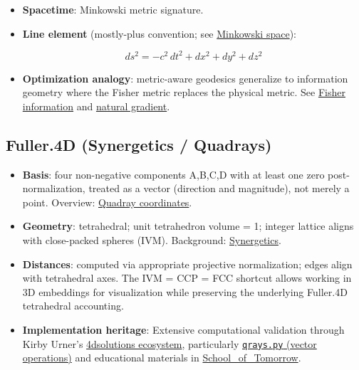 \documentclass[
  10pt,
]{article}
\providecommand{\tightlist}{%
  \setlength{\itemsep}{0pt}\setlength{\parskip}{0pt}}
\begin{document}
\begin{itemize}
\item
  \textbf{Spacetime}: Minkowski metric signature.
\item
  \textbf{Line element} (mostly-plus convention; see
  \href{https://en.wikipedia.org/wiki/Minkowski_space}{Minkowski
  space}):

  \begin{equation}\label{eq:einstein_line_element}
  ds^2 = -c^2\,dt^2 + dx^2 + dy^2 + dz^2
  \end{equation}
\item
  \textbf{Optimization analogy}: metric-aware geodesics generalize to
  information geometry where the Fisher metric replaces the physical
  metric. See
  \href{https://en.wikipedia.org/wiki/Fisher_information}{Fisher
  information} and
  \href{https://en.wikipedia.org/wiki/Natural_gradient}{natural
  gradient}.
\end{itemize}

\hypertarget{fuller.4d-synergetics-quadrays}{%
\subsection{Fuller.4D (Synergetics /
Quadrays)}\label{fuller.4d-synergetics-quadrays}}

\begin{itemize}
\tightlist
\item
  \textbf{Basis}: four non-negative components A,B,C,D with at least one
  zero post-normalization, treated as a vector (direction and
  magnitude), not merely a point. Overview:
  \href{https://en.wikipedia.org/wiki/Quadray_coordinates}{Quadray
  coordinates}.
\item
  \textbf{Geometry}: tetrahedral; unit tetrahedron volume = 1; integer
  lattice aligns with close-packed spheres (IVM). Background:
  \href{https://en.wikipedia.org/wiki/Synergetics_(Fuller)}{Synergetics}.
\item
  \textbf{Distances}: computed via appropriate projective normalization;
  edges align with tetrahedral axes. The IVM = CCP = FCC shortcut allows
  working in 3D embeddings for visualization while preserving the
  underlying Fuller.4D tetrahedral accounting.
\item
  \textbf{Implementation heritage}: Extensive computational validation
  through Kirby Urner's
  \href{https://github.com/4dsolutions}{4dsolutions ecosystem},
  particularly
  \href{https://github.com/4dsolutions/m4w/blob/main/qrays.py}{\texttt{qrays.py}
  (vector operations)} and educational materials in
  \href{https://github.com/4dsolutions/School_of_Tomorrow}{School\_of\_Tomorrow}.
\end{itemize}
\end{document}
